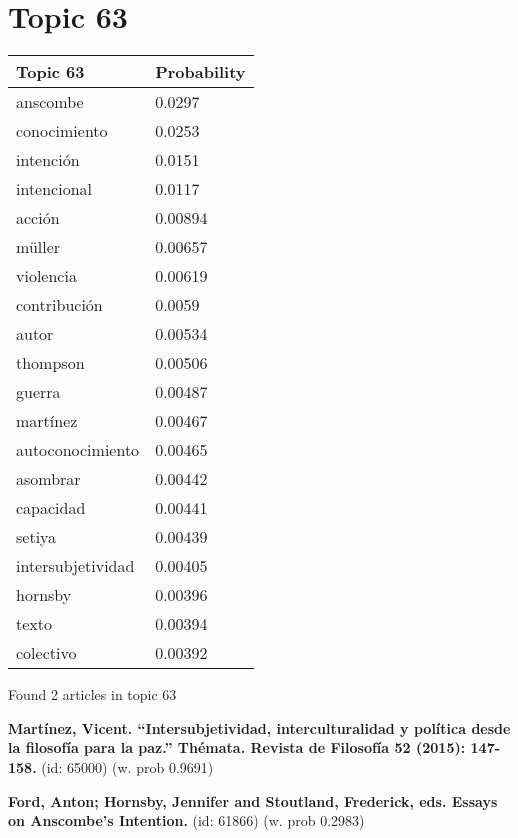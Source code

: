 \documentclass{article}
\begin{document}
\section*{Topic 63}\vfill
\begin{tabular}{ll}
\toprule
          Topic 63 & Probability \\
\midrule
          anscombe &      0.0297 \\
      conocimiento &      0.0253 \\
         intención &      0.0151 \\
       intencional &      0.0117 \\
            acción &     0.00894 \\
            müller &     0.00657 \\
         violencia &     0.00619 \\
      contribución &      0.0059 \\
             autor &     0.00534 \\
          thompson &     0.00506 \\
            guerra &     0.00487 \\
          martínez &     0.00467 \\
  autoconocimiento &     0.00465 \\
          asombrar &     0.00442 \\
         capacidad &     0.00441 \\
            setiya &     0.00439 \\
 intersubjetividad &     0.00405 \\
           hornsby &     0.00396 \\
             texto &     0.00394 \\
         colectivo &     0.00392 \\
\bottomrule
\end{tabular}

\vfill
Found 2 articles in topic 63
\vfill

\textbf{Martínez, Vicent. “Intersubjetividad, interculturalidad y política desde la filosofía para la paz.” Thémata. Revista de Filosofía 52 (2015): 147-158.} (id: 65000)
 (w. prob 0.9691)
\vfill

\textbf{Ford, Anton; Hornsby, Jennifer and Stoutland, Frederick, eds. Essays on Anscombe’s Intention.} (id: 61866)
 (w. prob 0.2983)

\vfill
\newpage


\centering
\thispagestyle{empty}
\end{document}
